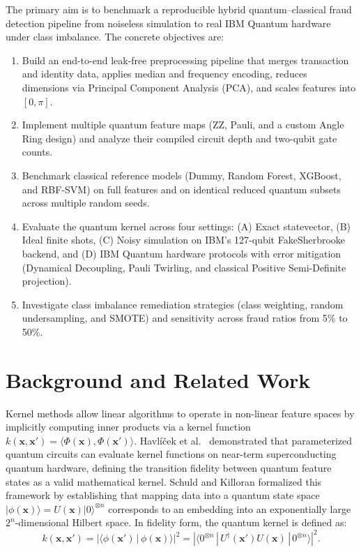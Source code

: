 \documentclass[12pt,a4paper]{article}
\begin{document}
The primary aim is to benchmark a reproducible hybrid quantum--classical fraud detection pipeline from noiseless simulation to real IBM Quantum hardware under class imbalance. The concrete objectives are:
\begin{enumerate}
    \item Build an end-to-end leak-free preprocessing pipeline that merges transaction and identity data, applies median and frequency encoding, reduces dimensions via Principal Component Analysis (PCA), and scales features into $[0, \pi]$.
    \item Implement multiple quantum feature maps (ZZ, Pauli, and a custom Angle Ring design) and analyze their compiled circuit depth and two-qubit gate counts.
    \item Benchmark classical reference models (Dummy, Random Forest, XGBoost, and RBF-SVM) on full features and on identical reduced quantum subsets across multiple random seeds.
    \item Evaluate the quantum kernel across four settings: (A) Exact statevector, (B) Ideal finite shots, (C) Noisy simulation on IBM's 127-qubit FakeSherbrooke backend, and (D) IBM Quantum hardware protocols with error mitigation (Dynamical Decoupling, Pauli Twirling, and classical Positive Semi-Definite projection).
    \item Investigate class imbalance remediation strategies (class weighting, random undersampling, and SMOTE) and sensitivity across fraud ratios from 5\% to 50\%.
\end{enumerate}

\section{Background and Related Work}

Kernel methods allow linear algorithms to operate in non-linear feature spaces by implicitly computing inner products via a kernel function $k(\mathbf{x}, \mathbf{x}') = \langle \Phi(\mathbf{x}), \Phi(\mathbf{x}') \rangle$. Havl\'{i}\v{c}ek et al.\ \cite{havlicek2019} demonstrated that parameterized quantum circuits can evaluate kernel functions on near-term superconducting quantum hardware, defining the transition fidelity between quantum feature states as a valid mathematical kernel. Schuld and Killoran \cite{schuld2019} formalized this framework by establishing that mapping data into a quantum state space $|\phi(\mathbf{x})\rangle = U(\mathbf{x})|0\rangle^{\otimes n}$ corresponds to an embedding into an exponentially large $2^n$-dimensional Hilbert space. In fidelity form, the quantum kernel is defined as:
\begin{equation}
    k(\mathbf{x}, \mathbf{x}') = \left|\langle \phi(\mathbf{x}') \,|\, \phi(\mathbf{x})\rangle\right|^{2} = \left|\langle 0^{\otimes n} \,|\, U^{\dagger}(\mathbf{x}') U(\mathbf{x}) \,|\, 0^{\otimes n}\rangle\right|^{2}.
    \label{eq:kernel_def}
\end{equation}
\end{document}
